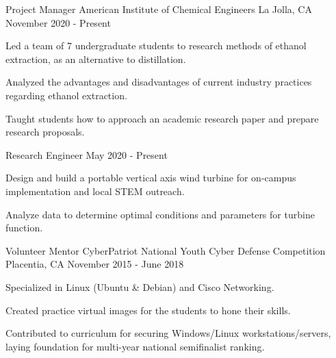 \begin{cventries}
\cventrytwo
{Project Manager} %
{American Institute of Chemical Engineers} %
{La Jolla, CA} %
{November 2020 - Present} %
{
  \begin{cvitems} %
    \item {Led a team of 7 undergraduate students to research methods of ethanol extraction, as an alternative to distillation.}
    \item {Analyzed the advantages and disadvantages of current industry practices regarding ethanol extraction.}
    \item {Taught students how to approach an academic research paper and prepare research proposals.}
  \end{cvitems}
}
    {Research Engineer} %
    {May 2020 - Present} %
    {
        \begin{cvitems} %
            \item {Design and build a portable vertical axis wind turbine for on-campus implementation and local STEM outreach.}
            \item {Analyze data to determine optimal conditions and parameters for turbine function.}
        \end{cvitems}
    }
 \cventry
    {Volunteer Mentor} %
    {CyberPatriot National Youth Cyber Defense Competition} %
    {Placentia, CA} %
    {November 2015 - June 2018} %
    {
      \begin{cvitems} %
        \item {Specialized in Linux (Ubuntu \& Debian) and Cisco Networking.}
        \item {Created practice virtual images for the students to hone their skills.}
        \item {Contributed to curriculum for securing Windows/Linux workstations/servers, laying foundation for multi-year national semifinalist ranking.}

\end{cvitems}}
\end{cventries}
